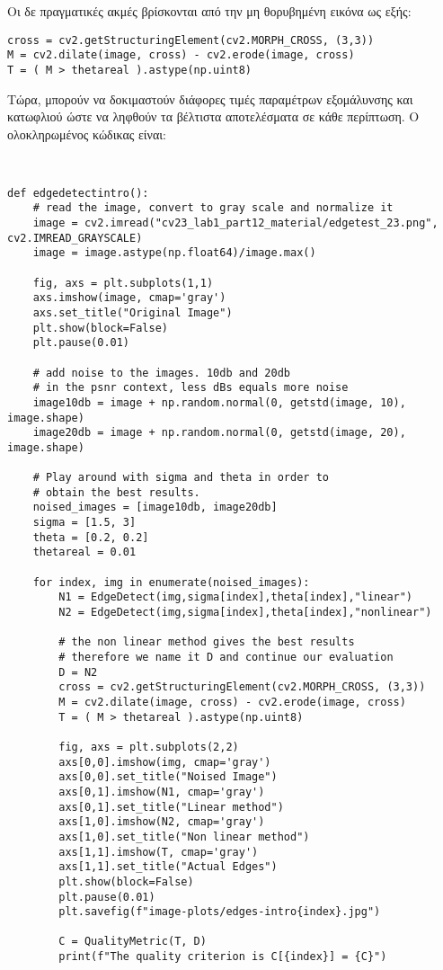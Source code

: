 \documentclass{article}
\begin{document}
Οι δε πραγματικές ακμές βρίσκονται από την μη θορυβημένη εικόνα ως εξής:

\begin{lstlisting}[breaklines=true, showstringspaces=false]
cross = cv2.getStructuringElement(cv2.MORPH_CROSS, (3,3))
M = cv2.dilate(image, cross) - cv2.erode(image, cross)
T = ( M > thetareal ).astype(np.uint8)
\end{lstlisting}

Τώρα, μπορούν να δοκιμαστούν διάφορες τιμές παραμέτρων εξομάλυνσης και κατωφλιού ώστε να ληφθούν τα βέλτιστα αποτελέσματα σε κάθε περίπτωση. Ο ολοκληρωμένος κώδικας είναι:

\begin{lstlisting}[breaklines=true, showstringspaces=false]


def edgedetectintro():
    # read the image, convert to gray scale and normalize it
    image = cv2.imread("cv23_lab1_part12_material/edgetest_23.png", cv2.IMREAD_GRAYSCALE)
    image = image.astype(np.float64)/image.max()

    fig, axs = plt.subplots(1,1)
    axs.imshow(image, cmap='gray')
    axs.set_title("Original Image")
    plt.show(block=False)
    plt.pause(0.01)

    # add noise to the images. 10db and 20db
    # in the psnr context, less dBs equals more noise
    image10db = image + np.random.normal(0, getstd(image, 10), image.shape)
    image20db = image + np.random.normal(0, getstd(image, 20), image.shape)

    # Play around with sigma and theta in order to
    # obtain the best results. 
    noised_images = [image10db, image20db]
    sigma = [1.5, 3]
    theta = [0.2, 0.2]
    thetareal = 0.01

    for index, img in enumerate(noised_images):
        N1 = EdgeDetect(img,sigma[index],theta[index],"linear")
        N2 = EdgeDetect(img,sigma[index],theta[index],"nonlinear")

        # the non linear method gives the best results
        # therefore we name it D and continue our evaluation
        D = N2
        cross = cv2.getStructuringElement(cv2.MORPH_CROSS, (3,3))
        M = cv2.dilate(image, cross) - cv2.erode(image, cross)
        T = ( M > thetareal ).astype(np.uint8)

        fig, axs = plt.subplots(2,2)
        axs[0,0].imshow(img, cmap='gray')
        axs[0,0].set_title("Noised Image")
        axs[0,1].imshow(N1, cmap='gray')
        axs[0,1].set_title("Linear method")
        axs[1,0].imshow(N2, cmap='gray')
        axs[1,0].set_title("Non linear method")
        axs[1,1].imshow(T, cmap='gray')
        axs[1,1].set_title("Actual Edges")
        plt.show(block=False)
        plt.pause(0.01)
        plt.savefig(f"image-plots/edges-intro{index}.jpg")

        C = QualityMetric(T, D)
        print(f"The quality criterion is C[{index}] = {C}")

\end{lstlisting}
\end{document}
